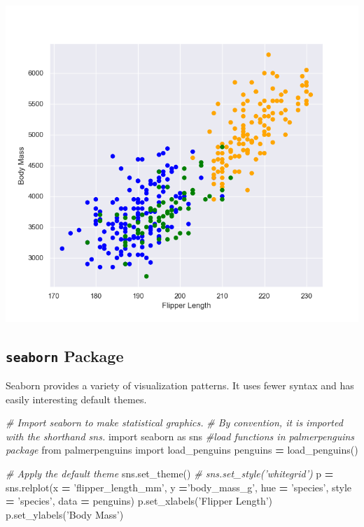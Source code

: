 \documentclass[]{book}
\newenvironment{Shaded}{\begin{snugshade}}{\end{snugshade}}
\newcommand{\CommentTok}[1]{\textcolor[rgb]{0.56,0.35,0.01}{\textit{#1}}}
\newcommand{\ImportTok}[1]{#1}
\newcommand{\NormalTok}[1]{#1}
\newcommand{\OperatorTok}[1]{\textcolor[rgb]{0.81,0.36,0.00}{\textbf{#1}}}
\newcommand{\StringTok}[1]{\textcolor[rgb]{0.31,0.60,0.02}{#1}}
\begin{document}
\begin{center}\includegraphics[width=0.9\linewidth]{fig/Viz_chap/1_matplot} \end{center}

\hypertarget{seaborn-package}{%
\subsection{\texorpdfstring{\texttt{seaborn} Package}{seaborn Package}}\label{seaborn-package}}

Seaborn provides a variety of visualization patterns. It uses fewer syntax and has easily interesting default themes.

\begin{Shaded}
\begin{Highlighting}[]
\CommentTok{# Import seaborn to make statistical graphics. }
\CommentTok{# By convention, it is imported with the shorthand sns.}
\ImportTok{import}\NormalTok{ seaborn }\ImportTok{as}\NormalTok{ sns }
\CommentTok{#load functions in palmerpenguins package}
\ImportTok{from}\NormalTok{ palmerpenguins }\ImportTok{import}\NormalTok{ load_penguins}
\NormalTok{penguins }\OperatorTok{=}\NormalTok{ load_penguins()}

\CommentTok{# Apply the default theme}
\NormalTok{sns.set_theme()}
\CommentTok{# sns.set_style('whitegrid')}
\NormalTok{p }\OperatorTok{=}\NormalTok{ sns.relplot(x }\OperatorTok{=} \StringTok{'flipper_length_mm'}\NormalTok{,}
\NormalTok{            y }\OperatorTok{=}\StringTok{'body_mass_g'}\NormalTok{,}
\NormalTok{            hue }\OperatorTok{=} \StringTok{'species'}\NormalTok{,}
\NormalTok{            style }\OperatorTok{=} \StringTok{'species'}\NormalTok{,}
\NormalTok{            data }\OperatorTok{=}\NormalTok{ penguins)}
\NormalTok{p.set_xlabels(}\StringTok{'Flipper Length'}\NormalTok{)}
\NormalTok{p.set_ylabels(}\StringTok{'Body Mass'}\NormalTok{)           }
\end{Highlighting}
\end{Shaded}
\end{document}
